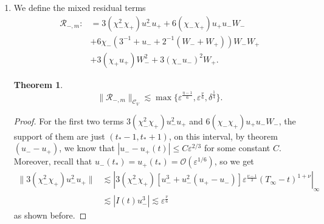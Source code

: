 \documentclass[letterpaper,11pt]{article}
\newcommand{\rmO}{\mathcal{O}}
\newcommand{\eps}{\varepsilon}
\newcommand{\lar}{ \lesssim }
\numberwithin{equation}{section}
\theoremstyle{plain}
\newtheorem{theorem}{Theorem}[section]
\begin{document}
\begin{itemize}
\begin{enumerate}
\begin{proof}
Finally for the cubic term, 
On $\eps^{-1}\delta<t$, the weight $I(t) = \delta^{\frac{1}{4}}\eps^{\frac{\nu-1}{3}}(T_\infty-t)^{1+\nu}$, it holds that 
\begin{align*}
\|W_-^3\| &\lar \delta^{-\frac{1}{4}}\eps^{\frac{\nu-1}{3}}(T_\infty - t)^{1+\nu}(\delta^{\frac{1}{4}} \eps^{\frac{1-\nu}{3}} (T_\infty - t)^{-\nu})^3 \\
& \lar \delta^{\frac{1}{2}} \eps^{\frac{2-2\nu}{3}} (T_\infty-t)^{1-\nu}(T_\infty-t)^{-\nu} \\
& \lar \delta^{\frac{1}{2}}\eps^{\frac{2(1-\nu)}{3}} \eps^{\frac{\nu-1}{3}} \delta^{\nu}  = \rmO(\eps^{\frac{1-\nu}{3}}).
\end{align*}

And for $0<t<\eps^{-1}\delta$, $I(t) = [\delta^{-\frac{1}{4}}(\delta-\eps t)^{\frac{3}{2}} + \delta^{\frac{1}{4}}\eps^{\frac{2}{3}}]^{-1}$, and $|W_-(t)| \lar \delta^{-\frac{1}{4}}(\delta-\eps t)+\delta^{\frac{1}{4}} \eps^{\frac{1}{3}}$
\begin{align*}
\|W_-(t)^3\| &\lar |I(t)W_-(t)^3| \lar \frac{(\delta^{\frac{3}{4}}\beta + \delta^{\frac{1}{4}}\eps^{\frac{1}{3}} )^3}{\delta^{\frac{5}{4}}\beta^{\frac{3}{2}} +\delta^{\frac{1}{4}}\eps^{\frac{2}{3}} } \\
& \lar \frac{ \delta^{\frac{9}{4}}\beta^3  }{\delta^{\frac{5}{4}}\beta^{\frac{3}{2}}} + \frac{\delta^{\frac{3}{4}}\eps}{\delta^{\frac{1}{4}} \eps^{\frac{2}{3}}}  = \delta \beta^{\frac{3}{2}} + \eps^{\frac{1}{3}}\delta\\
& = \rmO(\delta).
\end{align*}
\end{proof}

\item We define the mixed residual terms
\begin{align*}
\mathcal{R}_{-,m} :&= 3(\chi_-^2\chi_+) u_-^2 u_+  + 6(\chi_-\chi_+) u_+ u_-W_- \\ 
&+ 6\chi_-(3^{-1}+u_- +2^{-1}(W_-+W_+))W_-W_+
\\ 
&+3(\chi_+u_+)W_-^2 + 3(\chi_-u_-)^2W_+ .
\end{align*}

\begin{theorem}
\[
\|\mathcal{R}_{-,m} \|_{\mathcal{C}_V} \lar \max\{\eps^{\frac{\eta-1}{6}}, \eps^{\frac{\nu}{6}}, \delta^{\frac{1}{4}} \}.
\]
\end{theorem}
\begin{proof}
For the first two terms $3(\chi_-^2\chi_+)u_-^2u_+$ and $6(\chi_-\chi_+)u_+u_-W_-$, the support of them are just $(t_*-1,t_*+1)$, on this interval, by theorem $(u_--u_+)$, we know that $|u_- - u_+(t)| \le C\eps^{2/3}$ for some constant $C$. Moreover, recall that $u_-(t_*) = u_+(t_*) = \rmO(\eps^{1/6})$, so we get
\begin{align*}
\|3(\chi_-^2\chi_+)u_-^2u_+ \| &\lar | 3(\chi_-^2\chi_+)[u_-^3+u_-^2(u_+ -u_-)]  \eps^{\frac{\nu-1}{3}}(T_\infty -t)^{1+\nu} |_{\infty} \\
& \lar |I(t)u_-^3| \lar \eps^{\frac{\nu}{6}}
\end{align*}
as shown before.


\end{proof}
\end{enumerate}
\end{itemize}
\end{document}
